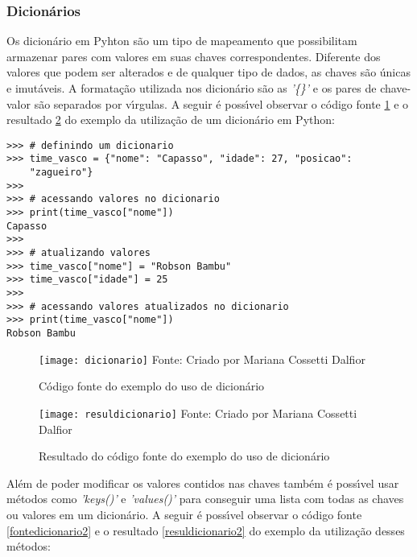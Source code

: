 \subsubsection{Dicion\'{a}rios}
Os dicion\'{a}rio em Pyhton s\~{a}o um tipo de mapeamento que possibilitam armazenar pares com valores em suas chaves correspondentes. Diferente dos valores que podem ser alterados e de qualquer tipo de dados, as chaves s\~{a}o \'{u}nicas e imut\'{a}veis. A formata\c{c}\~{a}o utilizada nos dicion\'{a}rio s\~{a}o as \textsl{'\{\}'} e os pares de chave-valor s\~{a}o separados por v\'{\i}rgulas. A seguir \'{e} poss\'{\i}vel observar o c\'{o}digo fonte \ref{fontedicionario} e o resultado \ref{resuldicionario} do exemplo da utiliza\c{c}\~{a}o de um dicion\'{a}rio em Python: \newline

\begin{lstlisting}
>>> # definindo um dicionario
>>> time_vasco = {"nome": "Capasso", "idade": 27, "posicao": 
	"zagueiro"}
>>> 
>>> # acessando valores no dicionario
>>> print(time_vasco["nome"]) 
Capasso
>>> 
>>> # atualizando valores
>>> time_vasco["nome"] = "Robson Bambu"
>>> time_vasco["idade"] = 25 
>>>
>>> # acessando valores atualizados no dicionario
>>> print(time_vasco["nome"]) 
Robson Bambu
\end{lstlisting}	

\begin{figure}[H]
	\begin{center}
		\caption{C\'{o}digo fonte do exemplo do uso de dicion\'{a}rio} \label{fontedicionario}
		\texttt{[image: dicionario]} 
		\newline
		Fonte: Criado por Mariana Cossetti Dalfior
	\end{center}
\end{figure}

\begin{figure}[H]
	\begin{center}
		\caption{Resultado do c\'{o}digo fonte do exemplo do uso de dicion\'{a}rio} \label{resuldicionario}
		\texttt{[image: resuldicionario]} 
		\newline
		Fonte: Criado por Mariana Cossetti Dalfior
	\end{center}
\end{figure}

Al\'{e}m de poder modificar os valores contidos nas chaves tamb\'{e}m \'{e} poss\'{\i}vel usar m\'{e}todos como \textsl{'keys()'} e \textsl{'values()'} para conseguir uma lista com todas as chaves ou valores em um dicion\'{a}rio. A seguir \'{e} poss\'{\i}vel observar o c\'{o}digo fonte \ref{fontedicionario2} e o resultado \ref{resuldicionario2} do exemplo da utiliza\c{c}\~{a}o desses m\'{e}todos:

